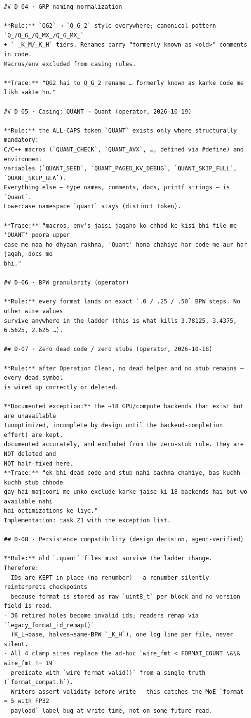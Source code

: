 \begin{verbatim}
## D-04 · GRP naming normalization

**Rule:** `QG2` → `Q_G_2` style everywhere; canonical pattern `Q_/Q_G_/Q_MX_/Q_G_MX_`
+ ` _K_M/_K_H` tiers. Renames carry "formerly known as <old>" comments in code.
Macros/env excluded from casing rules.

**Trace:** "QG2 hai to Q_G_2 rename … formerly known as karke code me likh sakte ho."

## D-05 · Casing: QUANT → Quant (operator, 2026-10-19)

**Rule:** the ALL-CAPS token `QUANT` exists only where structurally mandatory:
C/C++ macros (`QUANT_CHECK`, `QUANT_AVX`, …, defined via #define) and environment
variables (`QUANT_SEED`, `QUANT_PAGED_KV_DEBUG`, `QUANT_SKIP_FULL`, `QUANT_SKIP_GLA`).
Everything else — type names, comments, docs, printf strings — is `Quant`.
Lowercase namespace `quant` stays (distinct token).

**Trace:** "macros, env's jaisi jagaho ko chhod ke kisi bhi file me 'QUANT' poora upper
case me naa ho dhyaan rakhna, 'Quant' hona chahiye har code me aur har jagah, docs me
bhi."

## D-06 · BPW granularity (operator)

**Rule:** every format lands on exact `.0 / .25 / .50` BPW steps. No other wire values
survive anywhere in the ladder (this is what kills 3.78125, 3.4375, 6.5625, 2.625 …).

## D-07 · Zero dead code / zero stubs (operator, 2026-10-18)

**Rule:** after Operation Clean, no dead helper and no stub remains — every dead symbol
is wired up correctly or deleted.

**Documented exception:** the ~18 GPU/compute backends that exist but are unavailable
(unoptimized, incomplete by design until the backend-completion effort) are kept,
documented accurately, and excluded from the zero-stub rule. They are NOT deleted and
NOT half-fixed here.
**Trace:** "ek bhi dead code and stub nahi bachna chahiye, bas kuchh-kuchh stub chhode
gay hai majboori me unko exclude karke jaise ki 18 backends hai but wo available nahi
hai optimizations ke liye."
Implementation: task Z1 with the exception list.

## D-08 · Persistence compatibility (design decision, agent-verified)

**Rule:** old `.quant` files must survive the ladder change. Therefore:
- IDs are KEPT in place (no renumber) — a renumber silently reinterprets checkpoints
  because format is stored as raw `uint8_t` per block and no version field is read.
- 36 retired holes become invalid ids; readers remap via `legacy_format_id_remap()`
  (K_L→base, halves→same-BPW `_K_H`), one log line per file, never silent.
- All 4 clamp sites replace the ad-hoc `wire_fmt < FORMAT_COUNT \&\& wire_fmt != 19`
  predicate with `wire_format_valid()` from a single truth (`format_compat.h`).
- Writers assert validity before write — this catches the MoE `format = 5 with FP32
  payload` label bug at write time, not on some future read.


\end{verbatim}

